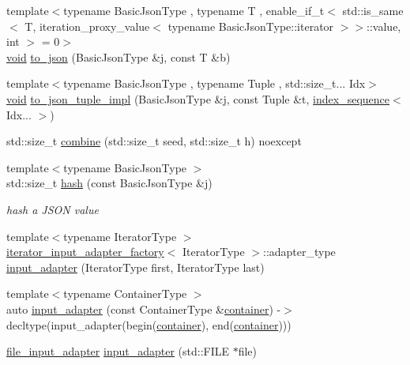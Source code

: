 \begin{DoxyCompactItemize}
{\footnotesize template$<$typename Basic\+Json\+Type , typename T , enable\+\_\+if\+\_\+t$<$ std\+::is\+\_\+same$<$ T, iteration\+\_\+proxy\+\_\+value$<$ typename Basic\+Json\+Type\+::iterator $>$$>$\+::value, int $>$  = 0$>$ }\\\hyperlink{namespacenlohmann_1_1detail_a59fca69799f6b9e366710cb9043aa77d}{void} \hyperlink{namespacenlohmann_1_1detail_aaa77b0c9745130b77733a92a1a2e82ec}{to\+\_\+json} (Basic\+Json\+Type \&j, const T \&b)
\item 
{\footnotesize template$<$typename Basic\+Json\+Type , typename Tuple , std\+::size\+\_\+t... Idx$>$ }\\\hyperlink{namespacenlohmann_1_1detail_a59fca69799f6b9e366710cb9043aa77d}{void} \hyperlink{namespacenlohmann_1_1detail_a510dfa15b01e9a8afe31600a27b28199}{to\+\_\+json\+\_\+tuple\+\_\+impl} (Basic\+Json\+Type \&j, const Tuple \&t, \hyperlink{structnlohmann_1_1detail_1_1index__sequence}{index\+\_\+sequence}$<$ Idx... $>$)
\item 
std\+::size\+\_\+t \hyperlink{namespacenlohmann_1_1detail_a66eb4d912b6f872d6983f7d0826f32c6}{combine} (std\+::size\+\_\+t seed, std\+::size\+\_\+t h) noexcept
\item 
{\footnotesize template$<$typename Basic\+Json\+Type $>$ }\\std\+::size\+\_\+t \hyperlink{namespacenlohmann_1_1detail_a679e5e522ac6afa5d5923292fab450b8}{hash} (const Basic\+Json\+Type \&j)
\begin{DoxyCompactList}\small\item\em hash a J\+S\+ON value \end{DoxyCompactList}\item 
{\footnotesize template$<$typename Iterator\+Type $>$ }\\\hyperlink{structnlohmann_1_1detail_1_1iterator__input__adapter__factory}{iterator\+\_\+input\+\_\+adapter\+\_\+factory}$<$ Iterator\+Type $>$\+::adapter\+\_\+type \hyperlink{namespacenlohmann_1_1detail_ad11a087dbe66eade5af4056aef9600bf}{input\+\_\+adapter} (Iterator\+Type first, Iterator\+Type last)
\item 
{\footnotesize template$<$typename Container\+Type $>$ }\\auto \hyperlink{namespacenlohmann_1_1detail_a8487ca95646f8368f70e279e9bf63396}{input\+\_\+adapter} (const Container\+Type \&\hyperlink{classcontainer}{container}) -\/$>$ decltype(input\+\_\+adapter(begin(\hyperlink{classcontainer}{container}), end(\hyperlink{classcontainer}{container})))
\item 
\hyperlink{classnlohmann_1_1detail_1_1file__input__adapter}{file\+\_\+input\+\_\+adapter} \hyperlink{namespacenlohmann_1_1detail_a520988513cac994a1dfd16b5859a1ca6}{input\+\_\+adapter} (std\+::\+F\+I\+LE $\ast$file)

\end{DoxyCompactItemize}
